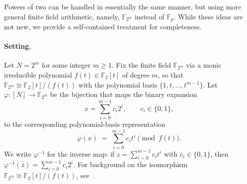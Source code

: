 \documentclass[journal]{IEEEtran}
\theoremstyle{definition}
\theoremstyle{definition}
\begin{document}
Powers of two can be handled in essentially the same manner, but using more general finite field arithmetic, namely, $\mathbb{F}_{2^{m}}$ instead of $\mathbb{F}_p$. While these ideas are not new, we provide a self-contained treatment for completeness.

\paragraph{Setting.}
Let \(N=2^{m}\) for some integer \(m\ge 1\). Fix the finite field \(\mathbb{F}_{2^{m}}\) via a monic irreducible polynomial \(f(t)\in \mathbb{F}_2[t]\) of degree \(m\), so that
\(\mathbb{F}_{2^{m}}\cong \mathbb{F}_2[t]/(f(t))\) with the polynomial basis \(\{1,t,\dots,t^{m-1}\}\).
Let \(\varphi:[N]\to \mathbb{F}_{2^{m}}\) be the bijection that maps the binary expansion
\[
x=\sum_{i=0}^{m-1} c_i 2^{i},\qquad c_i\in\{0,1\},
\]
to the corresponding polynomial-basis representation
\[
\varphi(x)\;=\;\sum_{i=0}^{m-1} c_i t^{i}\pmod{f(t)}.
\]
We write \(\varphi^{-1}\) for the inverse map: if
\(z=\sum_{i=0}^{m-1} c_i t^{i}\) with \(c_i\in\{0,1\}\), then
\(\varphi^{-1}(z)=\sum_{i=0}^{m-1} c_i 2^{i}\).
For background on the isomorphism \(\mathbb{F}_{2^m}\cong \mathbb{F}_2[t]/(f(t))\), see~\cite{mceliece2012finite}.

 
\end{document}
